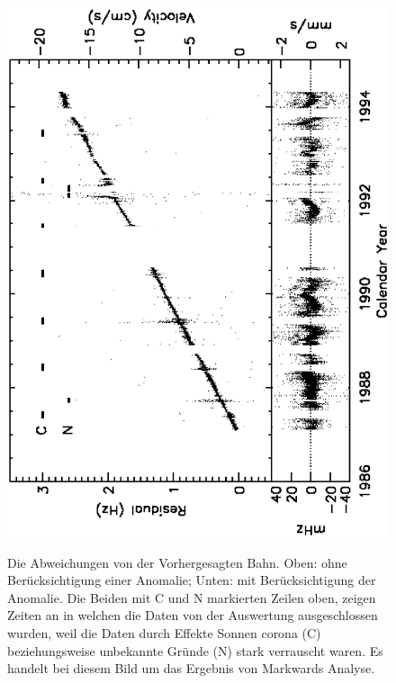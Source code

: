 \begin{figure}[htbb]
\begin{minipage}[t]{.6\linewidth}
	\centering
	\includegraphics[width=\linewidth,angle={-90}]{images/M02P10beide}
	\label{fig:Markwardvergl}
  \caption{Die Abweichungen von der Vorhergesagten Bahn. Oben: ohne Berücksichtigung einer Anomalie; Unten: mit Berücksichtigung der Anomalie. Die Beiden mit C und N markierten Zeilen oben, zeigen Zeiten an in welchen die Daten von der Auswertung ausgeschlossen wurden, weil die Daten durch Effekte Sonnen corona (C) beziehungsweise unbekannte Gründe (N) stark verrauscht waren. Es handelt bei diesem Bild um das Ergebnis von Markwards Analyse\cite{Markwardt2002}.}
\end{minipage}
	\centering
 \end{figure}
 
